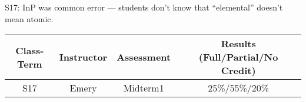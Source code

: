 \begin{outcomes}

S17: InP was common error --- students don't know that ``elemental'' doesn't mean atomic.

\begin{center}
	\begin{tabular}{cccc}
		\hline\hline
                Class-Term & Instructor & Assessment & Results (Full/Partial/No Credit) \\
		\hline
                S17 & Emery & Midterm1 & 25\%/55\%/20\%\\
		\hline
	\end{tabular}
\end{center}
\end{outcomes}

\begin{comments}


\end{comments}

